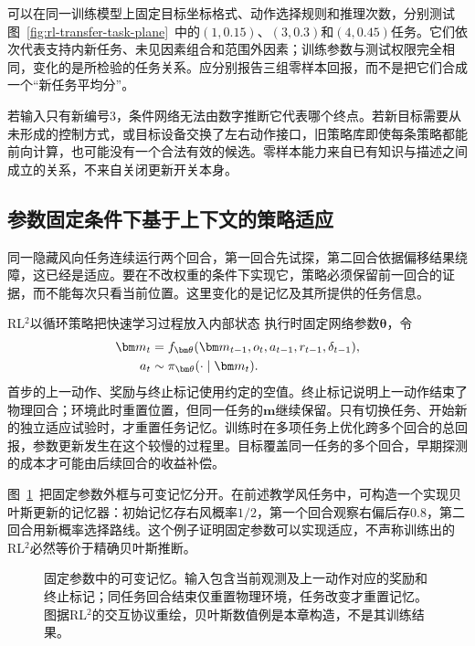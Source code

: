 可以在同一训练模型上固定目标坐标格式、动作选择规则和推理次数，分别测试图~\ref{fig:rl-transfer-task-plane}~中的$(1,0.15)$、$(3,0.3)$和$(4,0.45)$任务。它们依次代表支持内新任务、未见因素组合和范围外因素；训练参数与测试权限完全相同，变化的是所检验的任务关系。应分别报告三组零样本回报，而不是把它们合成一个“新任务平均分”。

若输入只有新编号3，条件网络无法由数字推断它代表哪个终点。若新目标需要从未形成的控制方式，或目标设备交换了左右动作接口，旧策略库即使每条策略都能前向计算，也可能没有一个合法有效的候选。零样本能力来自已有知识与描述之间成立的关系，不来自关闭更新开关本身。

\subsection{参数固定条件下基于上下文的策略适应}
\label{sec:rl-transfer-context-adaptation}

同一隐藏风向任务连续运行两个回合，第一回合先试探，第二回合依据偏移结果绕障，这已经是适应。要在不改权重的条件下实现它，策略必须保留前一回合的证据，而不能每次只看当前位置。这里变化的是记忆及其所提供的任务信息。

RL$^2$以循环策略把快速学习过程放入内部状态
执行时固定网络参数$\bm\theta$，令
\begin{align}
 \bm m_t
 &=f_{\bm\theta}(\bm m_{t-1},o_t,a_{t-1},r_{t-1},\delta_{t-1}),\notag\\
 a_t&\sim\pi_{\bm\theta}(\cdot\mid\bm m_t).
 \label{eq:rl-transfer-rl2}
\end{align}
首步的上一动作、奖励与终止标记使用约定的空值。终止标记说明上一动作结束了物理回合；环境此时重置位置，但同一任务的$\bm m$继续保留。只有切换任务、开始新的独立适应试验时，才重置任务记忆。训练时在多项任务上优化跨多个回合的总回报，参数更新发生在这个较慢的过程里。目标覆盖同一任务的多个回合，早期探测的成本才可能由后续回合的收益补偿。

图~\ref{fig:rl-transfer-rl2-memory}~把固定参数外框与可变记忆分开。在前述教学风任务中，可构造一个实现贝叶斯更新的记忆器：初始记忆存右风概率$1/2$，第一个回合观察右偏后存$0.8$，第二回合用新概率选择路线。这个例子证明固定参数可以实现适应，不声称训练出的RL$^2$必然等价于精确贝叶斯推断。

\begin{figure}[htbp]
 \centering
 
 \caption{固定参数中的可变记忆。输入包含当前观测及上一动作对应的奖励和终止标记；同任务回合结束仅重置物理环境，任务改变才重置记忆。图据RL$^2$的交互协议重绘，贝叶斯数值例是本章构造，不是其训练结果。}
 \label{fig:rl-transfer-rl2-memory}
\end{figure}

